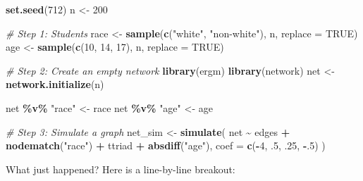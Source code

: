 \documentclass[
]{book}
\newenvironment{Shaded}{\begin{snugshade}}{\end{snugshade}}
\newcommand{\AttributeTok}[1]{\textcolor[rgb]{0.13,0.29,0.53}{#1}}
\newcommand{\CommentTok}[1]{\textcolor[rgb]{0.56,0.35,0.01}{\textit{#1}}}
\newcommand{\ConstantTok}[1]{\textcolor[rgb]{0.56,0.35,0.01}{#1}}
\newcommand{\DecValTok}[1]{\textcolor[rgb]{0.00,0.00,0.81}{#1}}
\newcommand{\FunctionTok}[1]{\textcolor[rgb]{0.13,0.29,0.53}{\textbf{#1}}}
\newcommand{\NormalTok}[1]{#1}
\newcommand{\OtherTok}[1]{\textcolor[rgb]{0.56,0.35,0.01}{#1}}
\newcommand{\SpecialCharTok}[1]{\textcolor[rgb]{0.81,0.36,0.00}{\textbf{#1}}}
\newcommand{\StringTok}[1]{\textcolor[rgb]{0.31,0.60,0.02}{#1}}
\begin{document}
\begin{Shaded}
\begin{Highlighting}[]
\FunctionTok{set.seed}\NormalTok{(}\DecValTok{712}\NormalTok{)}
\NormalTok{n }\OtherTok{\textless{}{-}} \DecValTok{200}

\CommentTok{\# Step 1: Students}
\NormalTok{race   }\OtherTok{\textless{}{-}} \FunctionTok{sample}\NormalTok{(}\FunctionTok{c}\NormalTok{(}\StringTok{"white"}\NormalTok{, }\StringTok{"non{-}white"}\NormalTok{), n, }\AttributeTok{replace =} \ConstantTok{TRUE}\NormalTok{)}
\NormalTok{age    }\OtherTok{\textless{}{-}} \FunctionTok{sample}\NormalTok{(}\FunctionTok{c}\NormalTok{(}\DecValTok{10}\NormalTok{, }\DecValTok{14}\NormalTok{, }\DecValTok{17}\NormalTok{), n, }\AttributeTok{replace =} \ConstantTok{TRUE}\NormalTok{)}

\CommentTok{\# Step 2: Create an empty network}
\FunctionTok{library}\NormalTok{(ergm)}
\FunctionTok{library}\NormalTok{(network)}
\NormalTok{net }\OtherTok{\textless{}{-}} \FunctionTok{network.initialize}\NormalTok{(n)}

\NormalTok{net }\SpecialCharTok{\%v\%} \StringTok{"race"}   \OtherTok{\textless{}{-}}\NormalTok{ race}
\NormalTok{net }\SpecialCharTok{\%v\%} \StringTok{"age"}    \OtherTok{\textless{}{-}}\NormalTok{ age}

\CommentTok{\# Step 3: Simulate a graph}
\NormalTok{net\_sim }\OtherTok{\textless{}{-}} \FunctionTok{simulate}\NormalTok{(}
\NormalTok{    net }\SpecialCharTok{\textasciitilde{}}\NormalTok{ edges }\SpecialCharTok{+}
    \FunctionTok{nodematch}\NormalTok{(}\StringTok{"race"}\NormalTok{) }\SpecialCharTok{+}
\NormalTok{    ttriad }\SpecialCharTok{+}
    \FunctionTok{absdiff}\NormalTok{(}\StringTok{"age"}\NormalTok{),}
    \AttributeTok{coef =} \FunctionTok{c}\NormalTok{(}\SpecialCharTok{{-}}\DecValTok{4}\NormalTok{, .}\DecValTok{5}\NormalTok{, .}\DecValTok{25}\NormalTok{, }\SpecialCharTok{{-}}\NormalTok{.}\DecValTok{5}\NormalTok{)}
\NormalTok{    )}
\end{Highlighting}
\end{Shaded}

What just happened? Here is a line-by-line breakout:
\end{document}
